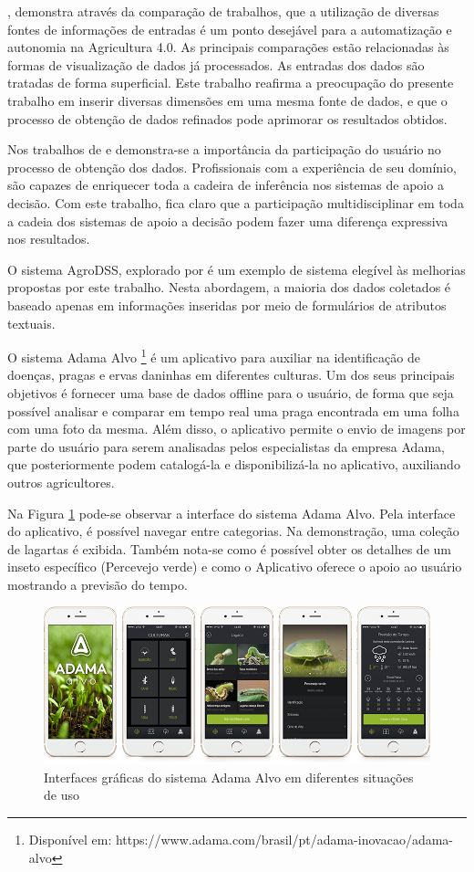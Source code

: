 \documentclass[12pt]{article}
\begin{document}
\cite{Gutierrez:2019}, demonstra através da comparação de trabalhos, que a utilização de diversas fontes de informações de entradas é um ponto desejável para a automatização e autonomia na Agricultura 4.0. As principais comparações estão relacionadas às formas de visualização de dados já processados. As entradas dos dados são tratadas de forma superficial. Este trabalho reafirma a preocupação do presente trabalho em inserir diversas dimensões em uma mesma fonte de dados, e que o processo de obtenção de dados refinados pode aprimorar os resultados obtidos.

Nos trabalhos de \cite{Walling:2020} e \cite{Lundstrom:2018} demonstra-se a importância da participação do usuário no processo de obtenção dos dados. Profissionais com a experiência de seu domínio, são capazes de enriquecer toda a cadeira de inferência nos sistemas de apoio a decisão. Com este trabalho, fica claro que a participação multidisciplinar em toda a cadeia dos sistemas de apoio a decisão podem fazer uma diferença expressiva nos resultados.

O sistema AgroDSS, explorado por \cite{Rupnik:2019} é um exemplo de sistema elegível às melhorias propostas por este trabalho. Nesta abordagem, a maioria dos dados coletados é baseado apenas em informações inseridas por meio de formulários de atributos textuais.

O sistema Adama Alvo \footnote{Disponível em: https://www.adama.com/brasil/pt/adama-inovacao/adama-alvo} é um aplicativo para auxiliar na identificação de doenças, pragas e ervas daninhas em diferentes culturas. Um dos seus principais objetivos é fornecer uma base de dados offline para o usuário, de forma que seja possível analisar e comparar em tempo real uma praga encontrada em uma folha com uma foto da mesma. Além disso, o aplicativo permite o envio de imagens por parte do usuário para serem analisadas pelos especialistas da empresa Adama, que posteriormente podem catalogá-la e disponibilizá-la no aplicativo, auxiliando outros agricultores.

Na Figura \ref{fig:adamalvo} pode-se observar a interface do sistema Adama Alvo. Pela interface do aplicativo, é possível navegar entre categorias. Na demonstração, uma coleção de lagartas é exibida. Também nota-se como é possível obter os detalhes de um inseto específico (Percevejo verde) e como o Aplicativo oferece o apoio ao usuário mostrando a previsão do tempo.

\begin{figure}[!htb]
	\centering
  \includegraphics[scale=0.5]{images/AdamaAlvo.png}
  \caption{Interfaces gráficas do sistema Adama Alvo em diferentes situações de uso}
  \label{fig:adamalvo}
\end{figure}
\end{document}

